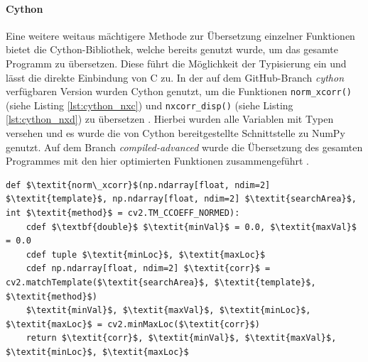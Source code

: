 \paragraph{Cython}

Eine weitere weitaus mächtigere Methode zur Übersetzung einzelner Funktionen bietet die Cython-Bibliothek, welche bereits genutzt wurde, um das gesamte Programm zu übersetzen. Diese führt die Möglichkeit der Typisierung ein und lässt die direkte Einbindung von C zu. In der auf dem GitHub-Branch \textit{cython} verfügbaren Version wurden Cython genutzt, um die Funktionen \texttt{norm\_xcorr()} (siehe Listing \ref{lst:cython_nxc}) und \texttt{nxcorr\_disp()} (siehe Listing \ref{lst:cython_nxd}) zu übersetzen \cite{Coj17}. Hierbei wurden alle Variablen mit Typen versehen und es wurde die von Cython bereitgestellte Schnittstelle zu NumPy genutzt. Auf dem Branch \textit{compiled-advanced} wurde die Übersetzung des gesamten Programmes mit den hier optimierten Funktionen zusammengeführt \cite{Coj17}. 

\begin{lstlisting}[caption={Die in Cython optimierte Funktion norm\_xcorr()}, label={lst:cython_nxc}]
def $\textit{norm\_xcorr}$(np.ndarray[float, ndim=2] $\textit{template}$, np.ndarray[float, ndim=2] $\textit{searchArea}$, int $\textit{method}$ = cv2.TM_CCOEFF_NORMED):
	cdef $\textbf{double}$ $\textit{minVal}$ = 0.0, $\textit{maxVal}$ = 0.0
	cdef tuple $\textit{minLoc}$, $\textit{maxLoc}$
	cdef np.ndarray[float, ndim=2] $\textit{corr}$ = cv2.matchTemplate($\textit{searchArea}$, $\textit{template}$, $\textit{method}$)
	$\textit{minVal}$, $\textit{maxVal}$, $\textit{minLoc}$, $\textit{maxLoc}$ = cv2.minMaxLoc($\textit{corr}$)
	return $\textit{corr}$, $\textit{minVal}$, $\textit{maxVal}$, $\textit{minLoc}$, $\textit{maxLoc}$
\end{lstlisting}

